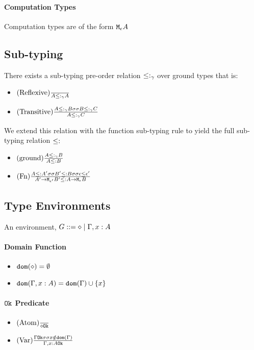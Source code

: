 {        \paragraph{Computation Types}
        Computation types are of the form $\texttt{M}_{\epsilon}{A}$

    \subsection{Sub-typing}
        There exists a sub-typing pre-order relation $\leq:_{\gamma}$ over ground types that is:
        \begin{itemize}
            \item $(\text{Reflexive}) \frac{}{A \leq:_{\gamma} A}$
            \item $(\text{Transitive}) \frac{A \leq:_{\gamma} B \sigma \sigma B \leq:_{\gamma} C}{A \leq:_{\gamma} C}$
        \end{itemize}

        We extend this relation with the function sub-typing rule to yield the full sub-typing relation $\leq:$

        \begin{itemize}
            \item $(\text{ground}) \frac{A \leq:_{\gamma} B}{A \leq: B}$
            \item $(\text{Fn}) \frac{A \leq: A' \sigma\sigma B' \leq: B \sigma \sigma \epsilon \leq \epsilon'}{A' \rightarrow \texttt{M}_{\epsilon'}{B'} \leq: A \rightarrow \texttt{M}_{\epsilon}{B}}$
        \end{itemize}
    \subsection{Type Environments}
    An environment, $G ::= \diamond \mid \Gamma, x: A$ 
    \paragraph{Domain Function}
    \begin{itemize}
        \item $\texttt{dom}(\diamond) = \emptyset$
        \item $\texttt{dom}(\Gamma, x: A) =  \texttt{dom}(\Gamma)  \cup \left\{x \right\}$
    \end{itemize}
    \paragraph{$\texttt{Ok}$ Predicate}
    \begin{itemize}
        \item $(\text{Atom}) \frac{}{\diamond \texttt{Ok}}$
        \item $(\text{Var}) \frac{\Gamma \texttt{Ok} \sigma\sigma x\notin \texttt{dom}(\Gamma)}{\Gamma, x: A \texttt{Ok}}$
    \end{itemize}



}

